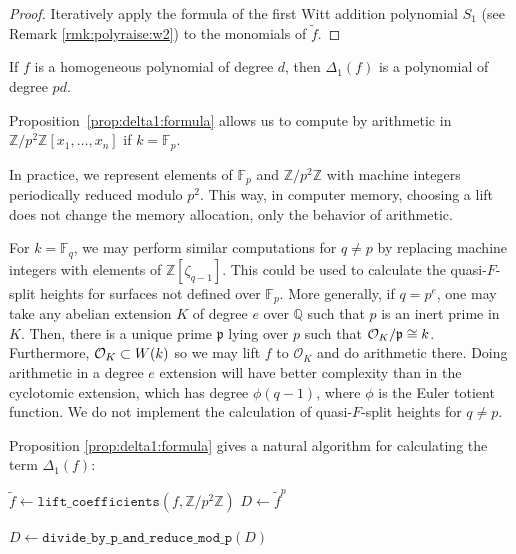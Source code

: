 \begin{proof}
	Iteratively apply the formula of the first
    Witt addition polynomial \(S_{1}\) (see Remark \ref{rmk:polyraise:w2})
	to the monomials of \(\tilde{f}\).
\end{proof}

\begin{rmk}
	If \(f\) is a homogeneous polynomial of degree \(d\),
	then \(\Delta_{1}(f)\) is a polynomial of degree \(pd\).
\end{rmk}

\begin{rmk}
    Proposition~\ref{prop:delta1:formula} allows us to compute by arithmetic in \(\mathbb{Z}/p^{2}\mathbb{Z}[x_{1},\ldots,x_{n}]\) if \(k=\mathbb{F}_{p}\).

    In practice, we represent elements of \(\mathbb{F}_{p}\)
    and \(\mathbb{Z} / p^{2} \mathbb{Z}\) with 
    machine integers periodically reduced modulo $p^2$.
    This way, in computer memory, choosing a lift does
    not change the memory allocation, only the behavior of arithmetic.
\end{rmk}

\begin{rmk}
    \label{rmk:lift:roi}
    For \(k = \mathbb{F}_{q}\),
    we may perform similar computations for 
    \(q \neq p\) by replacing machine integers with
    elements of \(\mathbb{Z}[\zeta_{q-1}]\).
    This could be used to calculate the quasi-\(F\)-split 
    heights for surfaces not defined over \(\mathbb{F}_{p}\).
    More generally, if \(q = p^{e}\), one may take
    any abelian extension \(K\) of degree \(e\) over \(\mathbb{Q}\) such that
    \(p\) is an inert prime in \(K\).
    Then, there is a unique prime \(\mathfrak{p}\) lying over \(p\) 
    such that \(\mathcal{O}_{K} / \mathfrak{p} \cong k\).
    Furthermore, \(\mathcal{O}_{K} \subset W(k)\)
    so we may lift \(f\) to \(\mathcal{O}_{K}\) 
    and do arithmetic there. 
    Doing arithmetic in a degree \(e\) extension will have
    better complexity than in the cyclotomic extension, which
    has degree \(\phi(q - 1)\), where
    \(\phi\) is the Euler totient function.
    We do not implement the calculation of quasi-\(F\)-split
    heights for \(q \neq p\).
\end{rmk}

Proposition \ref{prop:delta1:formula} gives a natural algorithm
for calculating the term \(\Delta_{1}(f)\):

\begin{algorithm}[H]
\caption{Calculation of \(\Delta_{1}(f)\)}
\label{alg:calc:delta1}

$\tilde{f} \gets \texttt{lift\_coefficients}(f,\mathbb{Z} / p^{2} \mathbb{Z})$\;
$D \gets \tilde{f}^p$\;


$D \gets \texttt{divide\_by\_p\_and\_reduce\_mod\_p}(D)$

\end{algorithm}

